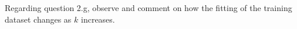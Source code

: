 \item {}

Regarding question 2.g, observe and comment on how the fitting of the training dataset changes as $k$ increases.
